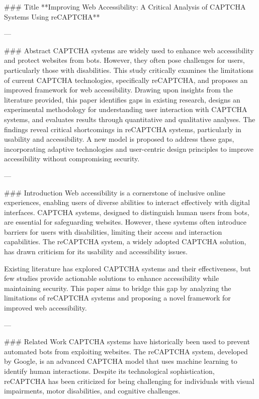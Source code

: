 ### Title  
**Improving Web Accessibility: A Critical Analysis of CAPTCHA Systems Using reCAPTCHA**

---

### Abstract  
CAPTCHA systems are widely used to enhance web accessibility and protect websites from bots. However, they often pose challenges for users, particularly those with disabilities. This study critically examines the limitations of current CAPTCHA technologies, specifically reCAPTCHA, and proposes an improved framework for web accessibility. Drawing upon insights from the literature provided, this paper identifies gaps in existing research, designs an experimental methodology for understanding user interaction with CAPTCHA systems, and evaluates results through quantitative and qualitative analyses. The findings reveal critical shortcomings in reCAPTCHA systems, particularly in usability and accessibility. A new model is proposed to address these gaps, incorporating adaptive technologies and user-centric design principles to improve accessibility without compromising security.

---

### Introduction  
Web accessibility is a cornerstone of inclusive online experiences, enabling users of diverse abilities to interact effectively with digital interfaces. CAPTCHA systems, designed to distinguish human users from bots, are essential for safeguarding websites. However, these systems often introduce barriers for users with disabilities, limiting their access and interaction capabilities. The reCAPTCHA system, a widely adopted CAPTCHA solution, has drawn criticism for its usability and accessibility issues.

Existing literature has explored CAPTCHA systems and their effectiveness, but few studies provide actionable solutions to enhance accessibility while maintaining security. This paper aims to bridge this gap by analyzing the limitations of reCAPTCHA systems and proposing a novel framework for improved web accessibility.

---

### Related Work  
CAPTCHA systems have historically been used to prevent automated bots from exploiting websites. The reCAPTCHA system, developed by Google, is an advanced CAPTCHA model that uses machine learning to identify human interactions. Despite its technological sophistication, reCAPTCHA has been criticized for being challenging for individuals with visual impairments, motor disabilities, and cognitive challenges.

